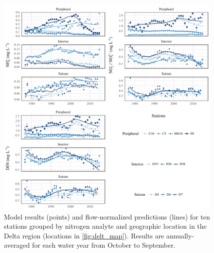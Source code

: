 \documentclass[letterpaper,12pt,oneside]{article}\usepackage[]{graphicx}\usepackage[]{color}
\makeatletter
\def\maxwidth{ %
  \ifdim\Gin@nat@width>\linewidth
    \linewidth
  \else
    \Gin@nat@width
  \fi
}
\makeatother
\begin{document}
\begin{figure}[!ht]

{\centering \includegraphics[width=\maxwidth]{figs/prddat-1} 

}

\caption{Model results (points) and flow-normalized predictions (lines) for ten stations grouped by nitrogen analyte and geographic location in the Delta region (locations in \cref{fig:delt_map}).  Results are annually-averaged for each water year from October to September.}\label{fig:prddat}
\end{figure}
\end{document}
